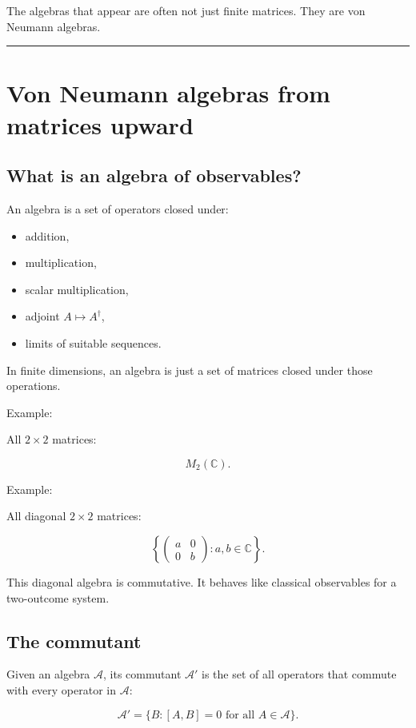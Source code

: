 \documentclass[11pt,a4paper]{article}
\begin{document}
The algebras that appear are often not just finite matrices. They are von Neumann algebras.

\medskip\hrule\medskip

\section{Von Neumann algebras from matrices upward}

\subsection{What is an algebra of observables?}

An algebra is a set of operators closed under:

\begin{itemize}
  \item addition,
  \item multiplication,
  \item scalar multiplication,
  \item adjoint $A\mapsto A^\dagger$,
  \item limits of suitable sequences.
\end{itemize}

In finite dimensions, an algebra is just a set of matrices closed under those operations.

Example:

All $2\times 2$ matrices:

\[
M_2(\mathbb{C}).
\]

Example:

All diagonal $2\times 2$ matrices:

\[
\left\{
\begin{pmatrix}
a & 0\\
0 & b
\end{pmatrix}
: a,b\in\mathbb{C}
\right\}.
\]

This diagonal algebra is commutative. It behaves like classical observables for a two-outcome system.

\subsection{The commutant}

Given an algebra $\mathcal{A}$, its commutant $\mathcal{A}'$ is the set of all operators that commute with every operator in $\mathcal{A}$:

\[
\mathcal{A}'=\{B:[A,B]=0\text{ for all }A\in\mathcal{A}\}.
\]
\end{document}
